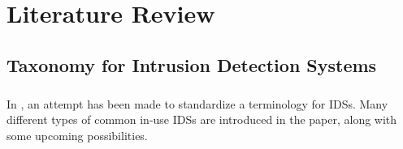 \chapter{Literature Review}
\label{ch:LR}
\section{Taxonomy for Intrusion Detection Systems}

\paragraph{}
In \cite{ids_taxonomy}, an attempt has been made to standardize a terminology for IDSs. Many different types of common in-use IDSs are introduced in the paper, along with some upcoming possibilities.

